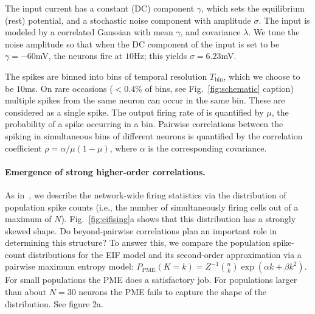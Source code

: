 \documentclass[%
 reprint,
 twocolumn,
 amsmath,amssymb,
 aps,
floatfix,
]{revtex4}
\begin{document}
The input current has a constant (DC) component $\gamma$, which sets the equilibrium (rest) potential, and a stochastic noise component with amplitude $\sigma$. The input is modeled by a correlated Gaussian with mean $\gamma$, and covariance $\lambda$.  We tune the noise amplitude so that when the DC component of the input is set to be $\gamma = -60$mV, the neurons fire at $10$Hz; this yields $\sigma = 6.23$mV.

The spikes are binned into bins of temporal resolution $T_\text{bin}$, which we choose to be $10$ms. On rare occasions ($<0.4\%$ of bins, see Fig.~\ref{fig:schematic} caption) multiple spikes from the same neuron can occur in the same bin. These are considered as a single spike.  The output firing rate of is quantified by $\mu$, the probability of a spike occurring in a bin.  Pairwise correlations between the spiking in simultaneous bins of different neurons is quantified by the correlation coefficient $\rho=\alpha/\mu(1-\mu)$, where $\alpha$ is the corresponding covariance.



\paragraph*{Emergence of strong higher-order correlations.}  As in~\cite{Macke,Barreiro,Panzeri,Amarietal03}, we describe the network-wide firing statistics via the distribution of population spike counts (i.e., the number of simultaneously firing cells out of a maximum of $N$).  Fig.~\ref{fig:eifising}a shows that this distribution has a strongly skewed shape.  Do beyond-pairwise correlations plan an important role in determining this structure?  To answer this, we compare the population spike-count distributions for the EIF model and its second-order approximation via a pairwise maximum entropy model: $P_{\text{PME}}(K = k) = Z^{-1} \binom{n}{k}\exp{(\alpha k + \beta k^2)}$. For small populations the PME does a satisfactory job. For populations larger than about $N=30$ neurons the PME fails to capture the shape of the distribution. 
See figure 2a.
\end{document}
